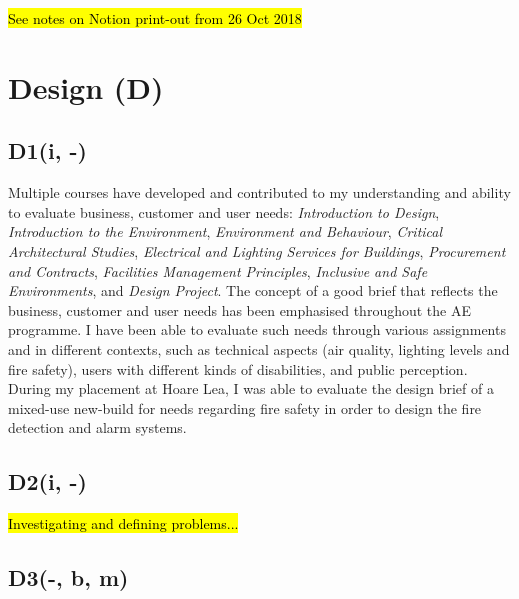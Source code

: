 \hl{See notes on Notion print-out from 26 Oct 2018}


\section{Design (D)}

\subsection*{D1(i, -)}

Multiple courses have developed and contributed to my understanding and ability to evaluate business, customer and user needs:
\textit{Introduction to Design},
\textit{Introduction to the Environment},
\textit{Environment and Behaviour},
\textit{Critical Architectural Studies},
\textit{Electrical and Lighting Services for Buildings},
\textit{Procurement and Contracts},
\textit{Facilities Management Principles},
\textit{Inclusive and Safe Environments},
and \textit{Design Project}.
The concept of a good brief that reflects the business, customer and user needs has been emphasised throughout the AE programme.
I have been able to evaluate such needs through various assignments and in different contexts, such as technical aspects (air quality, lighting levels and fire safety), users with different kinds of disabilities, and public perception.
During my placement at Hoare Lea, I was able to evaluate the design brief of a mixed-use new-build for needs regarding fire safety in order to design the fire detection and alarm systems.



\subsection*{D2(i, -)}

\hl{Investigating and defining problems...}


\subsection*{D3(-, b, m)}

